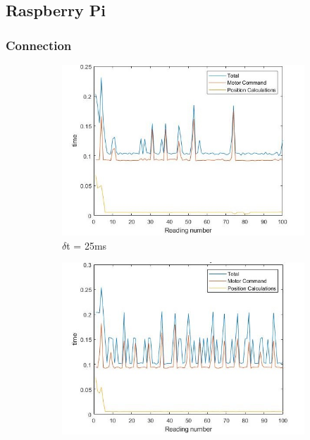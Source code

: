 \documentclass[twoside,twocolumn,12pt]{article}
\begin{document}
\subsection{Raspberry Pi}
\subsubsection{Connection}

\begin{figure}[t]
  \centering
  \begin{subfigure}[t]{0.325\textwidth}
    \includegraphics[width=\linewidth]{25ms_pi}
   \caption{$\delta$t = 25ms}
  \label{fig:pi25}
  \end{subfigure}
  \begin{subfigure}[t]{0.325\textwidth}
    \includegraphics[width=\linewidth]{50ms_pi}

\end{subfigure}
\end{figure}
\end{document}
